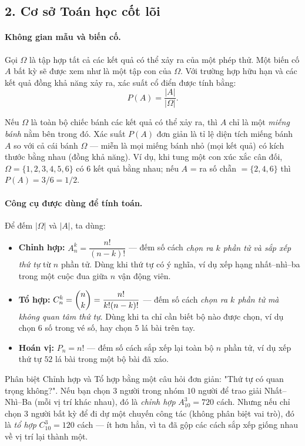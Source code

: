 \documentclass[12pt,a4paper]{article}
\theoremstyle{coloredthm}
\theoremstyle{coloreddef}
\theoremstyle{remark}
\begin{document}
\subsection*{2. Cơ sở Toán học cốt lõi}

\paragraph{Không gian mẫu và biến cố.}
Gọi $\Omega$ là tập hợp tất cả các kết quả có thể xảy ra của một phép thử. Một biến cố $A$ bất kỳ sẽ được xem như là một tập con của $\Omega$. Với trường hợp hữu hạn và các kết quả đồng khả năng xảy ra, xác suất cổ điển được tính bằng:
\[
P(A) = \frac{|A|}{|\Omega|}.
\]

\begin{giaithich}
Nếu $\Omega$ là toàn bộ chiếc bánh các kết quả có thể xảy ra, thì $A$ chỉ là một \emph{miếng bánh} nằm bên trong đó. Xác suất $P(A)$ đơn giản là tỉ lệ diện tích miếng bánh $A$ so với cả cái bánh $\Omega$ --- miễn là mọi miếng bánh nhỏ (mọi kết quả) có kích thước bằng nhau (đồng khả năng). Ví dụ, khi tung một con xúc xắc cân đối, $\Omega = \{1,2,3,4,5,6\}$ có $6$ kết quả bằng nhau; nếu $A$ = ra số chẵn $=\{2,4,6\}$ thì $P(A) = 3/6 = 1/2$.
\end{giaithich}

\paragraph{Công cụ được dùng để tính toán.} Để đếm $|\Omega|$ và $|A|$, ta dùng:
\begin{itemize}
    \item \textbf{Chỉnh hợp:} $A_n^k = \dfrac{n!}{(n-k)!}$ --- đếm số cách \emph{chọn ra $k$ phần tử và sắp xếp thứ tự} từ $n$ phần tử. Dùng khi thứ tự có ý nghĩa, ví dụ xếp hạng nhất--nhì--ba trong một cuộc đua giữa $n$ vận động viên.
    \item \textbf{Tổ hợp:} $C_n^k = \dbinom{n}{k} = \dfrac{n!}{k!(n-k)!}$ --- đếm số cách \emph{chọn ra $k$ phần tử mà không quan tâm thứ tự}. Dùng khi ta chỉ cần biết bộ nào được chọn, ví dụ chọn $6$ số trong vé số, hay chọn $5$ lá bài trên tay.
    \item \textbf{Hoán vị:} $P_n = n!$ --- đếm số cách sắp xếp lại toàn bộ $n$ phần tử, ví dụ xếp thứ tự $52$ lá bài trong một bộ bài đã xáo.
\end{itemize}

\begin{giaithich}
Phân biệt Chỉnh hợp và Tổ hợp bằng một câu hỏi đơn giản: "Thứ tự có quan trọng không?". Nếu bạn chọn $3$ người trong nhóm $10$ người để trao giải Nhất--Nhì--Ba (mỗi vị trí khác nhau), đó là \emph{chỉnh hợp} $A_{10}^3 = 720$ cách. Nhưng nếu chỉ chọn $3$ người bất kỳ để đi dự một chuyến công tác (không phân biệt vai trò), đó là \emph{tổ hợp} $C_{10}^3 = 120$ cách --- ít hơn hẳn, vì ta đã gộp các cách sắp xếp giống nhau về vị trí lại thành một.
\end{giaithich}
\end{document}
